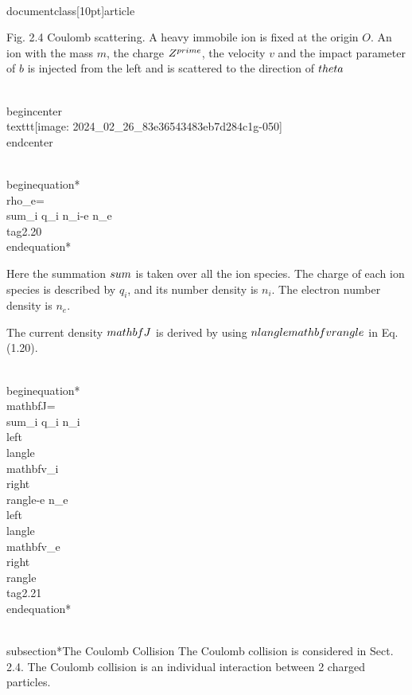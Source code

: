 \\documentclass[10pt]{article}
\begin{document}
Fig. 2.4 Coulomb scattering. A heavy immobile ion is fixed at the origin $O$. An ion with the mass $m$, the charge $Z^{\\prime}$, the velocity $v$ and the impact parameter of $b$ is injected from the left and is scattered to the direction of $\\theta$

\\begin{center}
\\texttt{[image: 2024\_02\_26\_83e36543483eb7d284c1g-050]}
\\end{center}


\\begin{equation*}
\\rho_{e}=\\sum_{i} q_{i} n_{i}-e n_{e} \\tag{2.20}
\\end{equation*}


Here the summation $\\sum$ is taken over all the ion species. The charge of each ion species is described by $q_{i}$, and its number density is $n_{i}$. The electron number density is $n_{e}$.

The current density $\\mathbf{J}$ is derived by using $n\\langle\\mathbf{v}\\rangle$ in Eq. (1.20).


\\begin{equation*}
\\mathbf{J}=\\sum_{i} q_{i} n_{i}\\left\\langle\\mathbf{v}_{i}\\right\\rangle-e n_{e}\\left\\langle\\mathbf{v}_{e}\\right\\rangle \\tag{2.21}
\\end{equation*}


\\subsection*{The Coulomb Collision}
The Coulomb collision is considered in Sect. 2.4. The Coulomb collision is an individual interaction between 2 charged particles.
\end{document}
